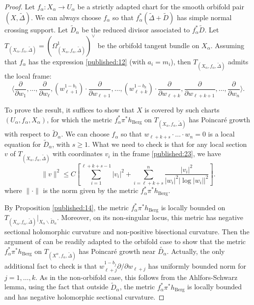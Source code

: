 \documentclass[10pt]{article}
\theoremstyle{definition}
\theoremstyle{remark}
\numberwithin{equation}{theorem}
\newcommand{\jepPubNorm}[1]{\lVert #1\rVert}
\begin{document}
\begin{proof} 
Let $f_\alpha : X_\alpha \longrightarrow U_\alpha$ be a strictly adapted chart for the smooth orbifold pair $(X, \widetilde{\Delta})$. We can always choose $f_\alpha$ so that $f_\alpha^\ast (\widetilde{\Delta} + \widetilde{D})$ has simple normal crossing support. Let $\widetilde{D}_\alpha$ be the reduced divisor associated to $f^\ast_\alpha \widetilde{D}$. Let $T_{(X_\alpha, f_\alpha, \widetilde{\Delta})} = \left( \Omega^1_{(X_\alpha, f_\alpha, \widetilde{\Delta})} \right)^{\vee}$ 
be the orbifold tangent bundle on $X_\alpha$. Assuming that $f_\alpha$ has the expression \eqref{published:12} (with $a_i = m_i$), then $T_{(X_\alpha, f_\alpha, \widetilde{\Delta})}$ admits the local frame:
\begin{equation} \label{published:23}
\langle    \frac{\partial}{\partial w_1}  , \ldots, \frac{\partial}{\partial w_\ell},  (w^{1 - b_1}_{\ell+1})\cdot \frac{\partial}{\partial w_{\ell+1}}, \ldots, (w^{1 - b_k}_{\ell+k})\cdot \frac{\partial}{\partial w_{\ell+k}}, 
\frac{\partial}{\partial w_{\ell+k+1}}, \ldots, \frac{\partial}{\partial w_n} \rangle. 
\end{equation}

To prove the result, it suffices to show that $X$ is covered by such charts $(U_\alpha, f_\alpha, X_\alpha)$, for which the metric $f_\alpha^\ast \pi^\ast h_{\mathrm{Berg}}$ on $T_{(X_\alpha, f_\alpha, \widetilde{\Delta})}$ has Poincaré growth with respect to $\widetilde{D}_\alpha$. We can choose $f_\alpha$ so that $w_{\ell+k+s} \cdot \ldots \cdot w_{n} = 0$ is a local equation for $\widetilde{D}_\alpha$, with $s \geqslant 1$. What we need to check is that for any local section $v$ of $T_{(X_\alpha, f_\alpha, \widetilde{\Delta})}$ with coordinates $v_i$ in the frame \eqref{published:23}, we have 
$$
\jepPubNorm{v}^2 \leqslant C \left[ \sum_{i =1}^{\ell+ k + s - 1} |v_i|^2 + \sum_{i=\ell+k+s}^{n}  \frac{|v_i|^2}{|w_i|^2 \left| \log |w_i| \right|^2} \right].
$$
where $\jepPubNorm{\cdot}$ is the norm given by the metric $f_\alpha^\ast \pi^\ast h_{\mathrm{Berg}}$.

By Proposition \ref{published:14}, the metric $f^\ast_\alpha \pi^\ast h_{\mathrm{Berg}}$ is locally bounded on $T_{(X_\alpha, f_\alpha, \widetilde{\Delta})}|_{X_\alpha \smallsetminus \widetilde{D}_\alpha}$. Moreover, on its non-singular locus, this metric has negative sectional holomorphic curvature and non-positive bisectional curvature. Then the argument of \cite[Prop.\,2.4]{pubref02} can be readily adapted to the orbifold case to show that the metric $f^\ast_\alpha \pi^\ast h_{\mathrm{Berg}}$ on $T_{(X^\alpha, f_\alpha, \widetilde{\Delta})}$ has Poincaré growth near $\widetilde{D_\alpha}$. Actually, the only additional fact to check is that $w_{\ell+j}^{1 - b_{j}}\partial/\partial w_{\ell+j}$ has uniformly bounded norm for $j = 1, \ldots, k$. As in the non-orbifold case, this follows from the Ahlfors-Schwarz lemma, using the fact that outside $\widetilde{D}_\alpha$, the metric $f_\alpha^\ast \pi^\ast  h_\mathrm{Berg}$ is locally bounded and has negative holomorphic sectional curvature.
\end{proof}
\end{document}
